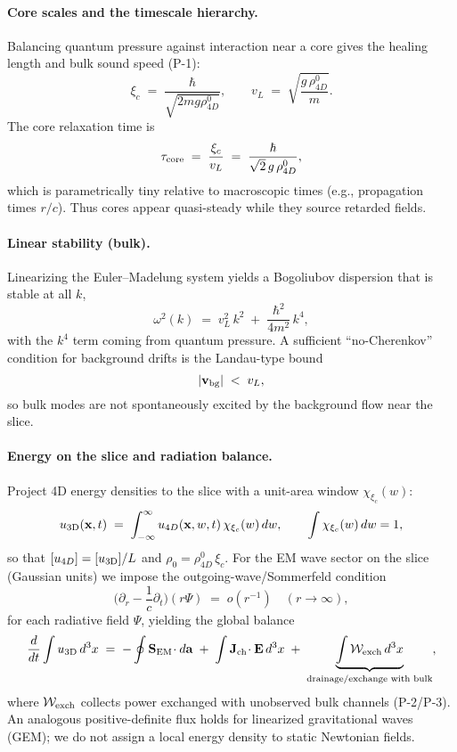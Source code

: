 \paragraph{Core scales and the timescale hierarchy.}
Balancing quantum pressure against interaction near a core gives the healing length and bulk sound speed (P-1):
\begin{equation}
\xi_c \;=\; \frac{\hbar}{\sqrt{2 m g \rho_{4D}^0}}, 
\qquad
v_L \;=\; \sqrt{\frac{g\,\rho_{4D}^0}{m}}.
\end{equation}
The core relaxation time is
\begin{equation}
\tau_{\rm core} \;=\; \frac{\xi_c}{v_L} \;=\; \frac{\hbar}{\sqrt{2}\,g\,\rho_{4D}^0},
\end{equation}
which is parametrically tiny relative to macroscopic times (e.g., propagation times $r/c$). Thus cores appear quasi-steady while they source retarded fields.

\paragraph{Linear stability (bulk).}
Linearizing the Euler–Madelung system yields a Bogoliubov dispersion that is stable at all $k$,
\begin{equation}
\omega^2(k) \;=\; v_L^2\,k^2 \;+\; \frac{\hbar^2}{4m^2}\,k^4,
\end{equation}
with the $k^4$ term coming from quantum pressure. A sufficient ``no-Cherenkov'' condition for background drifts is the Landau-type bound
\begin{equation}
|\mathbf v_{\rm bg}| \;<\; v_L,
\end{equation}
so bulk modes are not spontaneously excited by the background flow near the slice.

\paragraph{Energy on the slice and radiation balance.}
Project 4D energy densities to the slice with a unit-area window $\chi_{\xi_c}(w)$:
\begin{equation}
u_{\rm 3D}(\mathbf x,t) \;=\; \int_{-\infty}^{\infty} u_{4D}(\mathbf x,w,t)\,\chi_{\xi_c}(w)\,dw,
\qquad \int \chi_{\xi_c}(w)\,dw=1,
\end{equation}
so that $[u_{4D}]=[u_{\rm 3D}]/L$ and $\rho_0=\rho_{4D}^0\,\xi_c$. For the EM wave sector on the slice (Gaussian units) we impose the outgoing-wave/Sommerfeld condition
\[
\Big(\partial_r-\frac{1}{c}\partial_t\Big)\!(r\Psi)\;=\;o(r^{-1})\quad (r\to\infty),
\]
for each radiative field $\Psi$, yielding the global balance
\begin{equation}
\frac{d}{dt}\int u_{\rm 3D}\,d^3x
\;=\; -\oint \mathbf S_{\rm EM}\!\cdot d\mathbf a
\;+\;\int \mathbf J_{\rm ch}\!\cdot\mathbf E\,d^3x
\;+\;\underbrace{\int \mathcal W_{\rm exch}\,d^3x}_{\text{drainage/exchange with bulk}},
\end{equation}
where $\mathcal W_{\rm exch}$ collects power exchanged with unobserved bulk channels (P-2/P-3). An analogous positive-definite flux holds for linearized gravitational waves (GEM); we do not assign a local energy density to static Newtonian fields.

